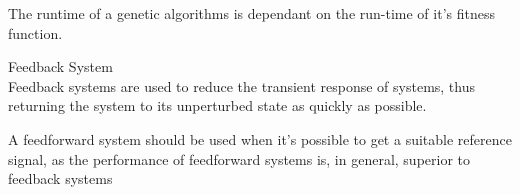 The runtime of a genetic algorithms is dependant on the run-time of it's fitness function.\cite{https://www.youtube.com/watch?v=uQj5UNhCPuo}

\large{Feedback System}\\
Feedback systems are used to reduce the transient response of systems, thus returning the system to its unperturbed state as quickly as possible.\cite{Fuller1995}


A feedforward system should be used when it's possible to get a suitable reference signal, as the performance of feedforward systems is, in general, superior to feedback systems \cite{Fuller1995}